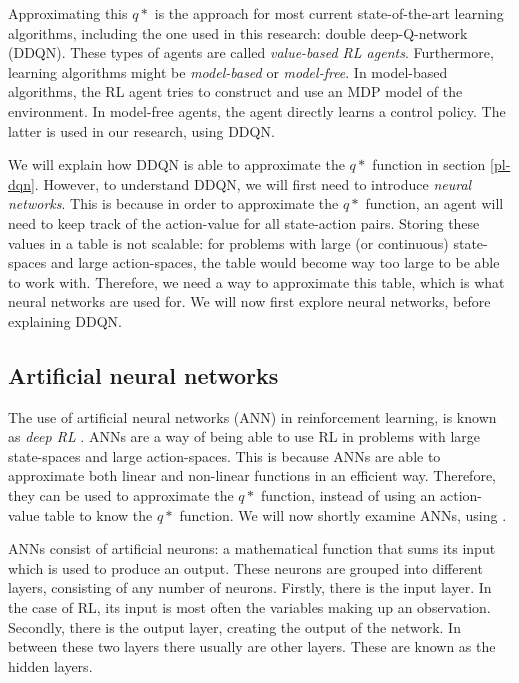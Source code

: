 Approximating this $q*$ is the approach for most current state-of-the-art learning algorithms, including the one used in this research: double deep-Q-network (DDQN). These types of agents are called \emph{value-based RL agents}. Furthermore, learning algorithms might be \emph{model-based} or \emph{model-free}. In model-based algorithms, the RL agent tries to construct and use an MDP model of the environment. In  model-free agents, the agent directly learns a control policy. The latter is used in our research, using DDQN.

We will explain how DDQN is able to approximate the $q*$ function in section \ref{pl-dqn}. However, to understand DDQN, we will first need to introduce \emph{neural networks}. This is because in order to approximate the $q*$ function, an agent will need to keep track of the action-value for all state-action pairs. Storing these values in a table is not scalable: for problems with large (or continuous) state-spaces and large action-spaces, the table would become way too large to be able to work with. Therefore, we need a way to approximate this table, which is what neural networks are used for. We will now first explore neural networks, before explaining DDQN.

\subsection{Artificial neural networks}\label{pl-nn}
The use of artificial neural networks (ANN) in reinforcement learning, is known as \emph{deep RL} \cite[p. 5]{grokking}. ANNs are a way of being able to use RL in problems with large state-spaces and large action-spaces. This is because ANNs are able to approximate both linear and non-linear functions in an efficient way\cite[p. 165-166]{nn}. Therefore, they can be used to approximate the $q*$ function, instead of using an action-value table to know the $q*$ function. We will now shortly examine ANNs, using \cite[p. 164-366]{nn}.

ANNs consist of artificial neurons: a mathematical function that sums its input which is used to produce an output. These neurons are grouped into different layers, consisting of any number of neurons. Firstly, there is the input layer. In the case of RL, its input is most often the variables making up an observation. Secondly, there is the output layer, creating the output of the network. In between these two layers there usually are other layers. These are known as the hidden layers. 

